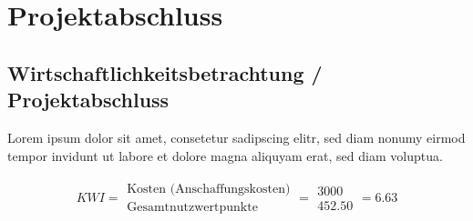 
\chapter{Projektabschluss} 
\section{Wirtschaftlichkeitsbetrachtung / Projektabschluss}
Lorem ipsum dolor sit amet, consetetur sadipscing elitr, sed diam nonumy eirmod tempor invidunt ut labore et dolore magna aliquyam erat, sed diam voluptua. 

\begin{align*}
	KWI =
	\begin{array}{lcr}
		\text{Kosten (Anschaffungskosten)}\\
	 	\hline
		\text{Gesamtnutzwertpunkte}
	\end{array}
	=
	\begin{array}{lcr}
		3000\\
		\hline
		452.50
	\end{array}
	= 6.63
\end{align*}